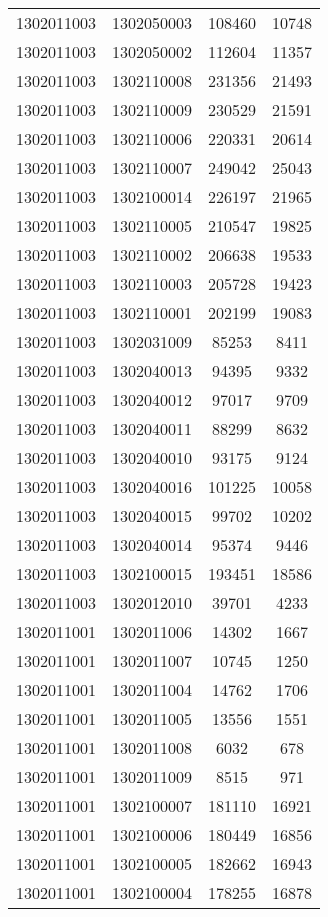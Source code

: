 \begin{longtable}[h]{llcc}
		1302011003 & 1302050003 & 108460 & 10748\\
		1302011003 & 1302050002 & 112604 & 11357\\
		1302011003 & 1302110008 & 231356 & 21493\\
		1302011003 & 1302110009 & 230529 & 21591\\
		1302011003 & 1302110006 & 220331 & 20614\\
		1302011003 & 1302110007 & 249042 & 25043\\
		1302011003 & 1302100014 & 226197 & 21965\\
		1302011003 & 1302110005 & 210547 & 19825\\
		1302011003 & 1302110002 & 206638 & 19533\\
		1302011003 & 1302110003 & 205728 & 19423\\
		1302011003 & 1302110001 & 202199 & 19083\\
		1302011003 & 1302031009 & 85253 & 8411\\
		1302011003 & 1302040013 & 94395 & 9332\\
		1302011003 & 1302040012 & 97017 & 9709\\
		1302011003 & 1302040011 & 88299 & 8632\\
		1302011003 & 1302040010 & 93175 & 9124\\
		1302011003 & 1302040016 & 101225 & 10058\\
		1302011003 & 1302040015 & 99702 & 10202\\
		1302011003 & 1302040014 & 95374 & 9446\\
		1302011003 & 1302100015 & 193451 & 18586\\
		1302011003 & 1302012010 & 39701 & 4233\\
		1302011001 & 1302011006 & 14302 & 1667\\
		1302011001 & 1302011007 & 10745 & 1250\\
		1302011001 & 1302011004 & 14762 & 1706\\
		1302011001 & 1302011005 & 13556 & 1551\\
		1302011001 & 1302011008 & 6032 & 678\\
		1302011001 & 1302011009 & 8515 & 971\\
		1302011001 & 1302100007 & 181110 & 16921\\
		1302011001 & 1302100006 & 180449 & 16856\\
		1302011001 & 1302100005 & 182662 & 16943\\
		1302011001 & 1302100004 & 178255 & 16878\\

\end{longtable}
